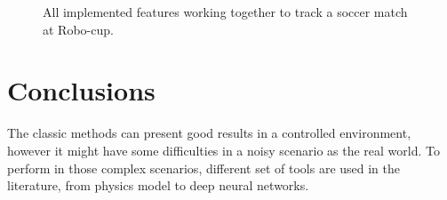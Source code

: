 \documentclass{sciposter}
\begin{document}
\begin{multicols}{3}
\begin{figure}[!h]
	\centering
			\setlength{\fboxsep}{1pt}
			\setlength{\fboxrule}{1pt}
	\caption{All implemented features working together to track a soccer match at Robo-cup.}
	\label{fig:robocup_1}
\end{figure}

\section{Conclusions}

The classic methods can present good results in a controlled environment, however it might have some difficulties in a noisy scenario as the real world. To perform in those complex scenarios, different set of tools are used in the literature, from physics model to deep neural networks.

\end{multicols}
\end{document}
